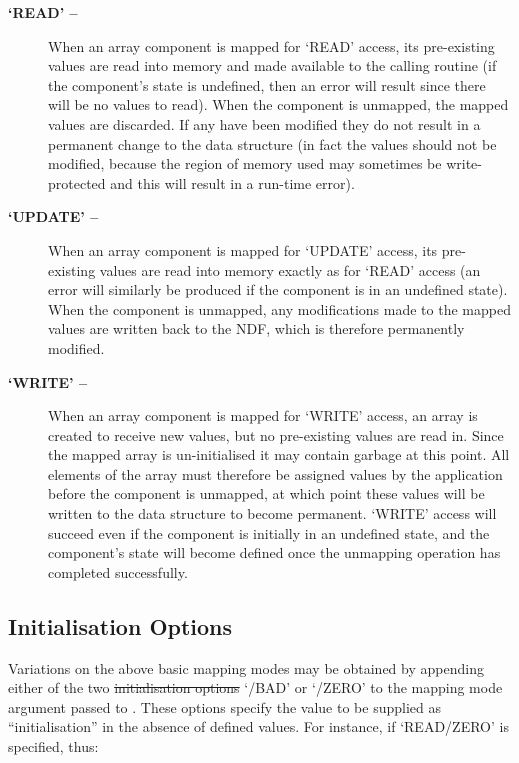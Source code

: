 \begin{description}

\item[{\bf `READ' --}] When an array component is mapped for `READ'
access, its pre-existing values are read into memory and made available to
the calling routine (if the component's state is undefined, then an error
will result since there will be no values to read). 
When the component is unmapped, the mapped values are discarded.
If any have been modified they do not result in a permanent change to the
data structure (in fact the values should not be modified, because the
region of memory used may sometimes be write-protected and this will result
in a run-time error). 

\item[{\bf `UPDATE' --}] When an array component is mapped for `UPDATE' access,
its pre-existing values are read into memory exactly as for `READ' access (an
error will similarly be produced if the component is in an undefined state). 
When the component is unmapped, any modifications made to the mapped values
are written back to the NDF, which is therefore permanently modified. 

\item[{\bf `WRITE' --}] When an array component is mapped for `WRITE'
access, an array is created to receive new values, but no pre-existing
values are read in. 
Since the mapped array is un-initialised it may contain garbage at this
point. 
All elements of the array must therefore be assigned values by the
application before the component is unmapped, at which point these values
will be written to the data structure to become permanent. 
`WRITE' access will succeed even if the component is initially in an
undefined state, and the component's state will become defined once the
unmapping operation has completed successfully. 

\end{description}

\subsection{\label{ss:initialisationoptions}Initialisation Options}

Variations on the above basic mapping modes may be obtained by appending
either of the two \st{initialisation options\/} `/BAD' or `/ZERO' to the
mapping mode argument passed to . 
These options specify the value to be supplied as ``initialisation'' in the
absence of defined values. 
For instance, if `READ/ZERO' is specified, thus:

